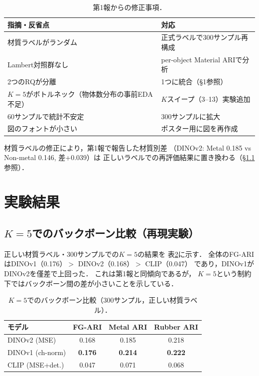 \documentclass[dvipdfmx,twocolumn]{jarticle}
\begin{document}
\begin{table}[t]
\centering
\caption{第1報からの修正事項．}
\label{tab:corrections}
\small
\begin{tabular}{p{3.2cm}p{4.2cm}}
\toprule
指摘・反省点 & 対応 \\
\midrule
材質ラベルがランダム & 正式ラベルで300サンプル再構成 \\
Lambert対照群なし & per-object Material ARIで分析 \\
2つのRQが分離 & 1つに統合（§1参照） \\
$K{=}5$がボトルネック（物体数分布の事前EDA不足） & $K$スイープ（3--13）実験追加 \\
60サンプルで統計不安定 & 300サンプルに拡大 \\
図のフォントが小さい & ポスター用に図を再作成 \\
\bottomrule
\end{tabular}
\end{table}

材質ラベルの修正により，第1報で報告した材質別差
（DINOv2: Metal 0.185 vs Non-metal 0.146, 差+0.039）は
正しいラベルでの再評価結果に置き換わる（§\ref{sec:k5_results}参照）．

\section{実験結果}

\subsection{$K{=}5$でのバックボーン比較（再現実験）}
\label{sec:k5_results}

正しい材質ラベル・300サンプルでの$K{=}5$の結果を
表\ref{tab:k5}に示す．
全体のFG-ARIはDINOv1（0.176）$>$ DINOv2（0.168）$>$ CLIP（0.047）
であり，DINOv1がDINOv2を僅差で上回った．
これは第1報と同傾向であるが，
$K{=}5$という制約下ではバックボーン間の差が小さいことを示している．

\begin{table}[t]
\centering
\caption{$K{=}5$でのバックボーン比較（300サンプル，正しい材質ラベル）．}
\label{tab:k5}
\small
\begin{tabular}{lccc}
\toprule
モデル & FG-ARI & Metal ARI & Rubber ARI \\
\midrule
DINOv2 (MSE) & 0.168 & 0.185 & 0.218 \\
DINOv1 (ch-norm) & \textbf{0.176} & \textbf{0.214} & \textbf{0.222} \\
CLIP (MSE+det.) & 0.047 & 0.071 & 0.068 \\
\bottomrule
\end{tabular}
\end{table}
\end{document}
